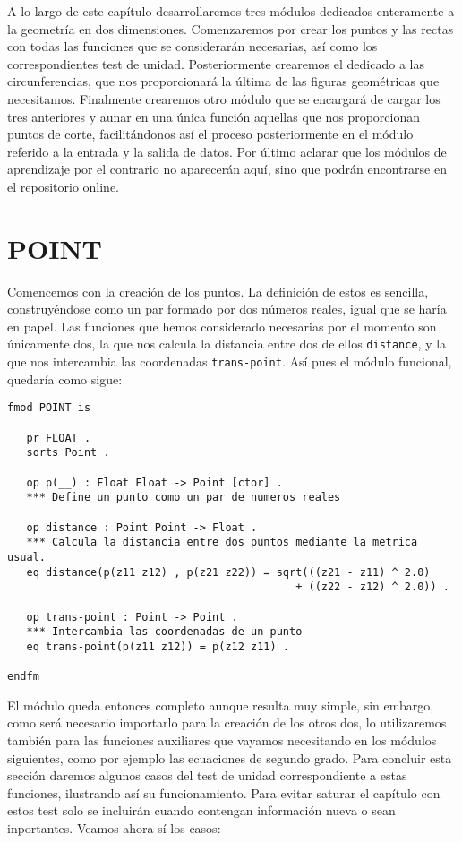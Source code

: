 
A lo largo de este capítulo desarrollaremos tres módulos dedicados enteramente a la geometría en dos dimensiones. Comenzaremos por crear los puntos y las rectas con todas las funciones que se considerarán necesarias, así como los correspondientes test de unidad. Posteriormente crearemos el dedicado a las circunferencias, que nos proporcionará la última de las figuras geométricas que necesitamos. Finalmente crearemos otro módulo que se encargará de cargar los tres anteriores y aunar en una única función aquellas que nos proporcionan puntos de corte, facilitándonos así el proceso posteriormente en el módulo referido a la entrada y la salida de datos. Por último aclarar que los módulos de aprendizaje por el contrario no aparecerán aquí, sino que podrán encontrarse en el repositorio online.


\section{POINT}

Comencemos con la creación de los puntos. La definición de estos es sencilla, construyéndose como un par formado por dos números reales, igual que se haría en papel. Las funciones que hemos considerado necesarias por el momento son únicamente dos, la que nos calcula la distancia entre dos de ellos \texttt{distance}, y la que nos intercambia las coordenadas \texttt{trans-point}. Así pues el módulo funcional, quedaría como sigue:
{\codesize
\begin{verbatim}
fmod POINT is

   pr FLOAT .
   sorts Point .

   op p(__) : Float Float -> Point [ctor] .
   *** Define un punto como un par de numeros reales

   op distance : Point Point -> Float .
   *** Calcula la distancia entre dos puntos mediante la metrica usual.
   eq distance(p(z11 z12) , p(z21 z22)) = sqrt(((z21 - z11) ^ 2.0) 
                                             + ((z22 - z12) ^ 2.0)) .

   op trans-point : Point -> Point .
   *** Intercambia las coordenadas de un punto
   eq trans-point(p(z11 z12)) = p(z12 z11) .

endfm
\end{verbatim}
}

El módulo queda entonces completo aunque resulta muy simple, sin embargo, como será necesario importarlo para la creación de los otros dos, lo utilizaremos también para las funciones auxiliares que vayamos necesitando en los módulos siguientes, como por ejemplo las ecuaciones de segundo grado. Para concluir esta sección daremos algunos casos del test de unidad correspondiente a estas funciones, ilustrando así su funcionamiento. Para evitar saturar el capítulo con estos test solo se incluirán cuando contengan información nueva o sean inportantes. Veamos ahora sí los casos:\par


